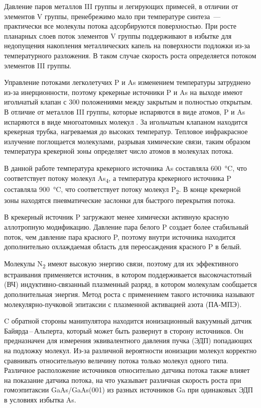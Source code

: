 Давление паров металлов III группы и легирующих примесей, в отличии от
элементов V группы, пренебрежимо мало при температуре синтеза~--- практически
все молекулы потока адсорбируются поверхностью. При росте планарных слоев поток
элементов V группы поддерживают в избытке для недопущения накопления
металлических капель на поверхности подложки из-за температурного разложения. В
таком случае скорость роста определяется потоком элементов III группы.

Управление потоками легколетучих P и As изменением температуры затруднено из-за
инерционности, поэтому крекерные источники P и As на выходе имеют игольчатый
клапан с 300 положениями между закрытым и полностью открытым. В отличие от
металлов III группы, которые испаряются в виде атомов, P и As испаряются в виде
многоатомных молекул \cite{Neave1980}. За игольчатым клапаном находится
крекерная трубка, нагреваемая до высоких температур. Тепловое инфракрасное
излучение поглощается молекулами, разрывая химические связи, таким образом
температура крекерной зоны определяет число атомов в молекулах потока.

В данной работе температура крекерного источника As составляла
600~\si{\degreeCelsius}, что соответствует потоку молекул As\textsubscript{4},
а температура крекерного источника P составляла 900~\si{\degreeCelsius}, что
соответствует потоку молекул P\textsubscript{2}. В конце крекерной зоны
находятся пневматические заслонки для быстрого перекрытия потока.

В крекерный источник P загружают менее химически активную красную аллотропную
модификацию. Давление пара белого P создает более стабильный поток, чем
давление пара красного P, поэтому внутри источника находится дополнительно
охлаждаемая область для переосаждения красного P в белый.

Молекулы N\textsubscript{2} имеют высокую энергию связи, поэтому для их
эффективного встраивания применяется источник, в котором поддерживается
высокочастотный (ВЧ) индуктивно-связанный плазменный разряд, в котором
молекулам сообщается дополнительная энергия. Метод роста с применением такого
источника называют молекулярно-пучковой эпитаксии с плазменной активацией азота
(ПА-МПЭ).

C обратной стороны манипулятора находится ионизационный вакуумный датчик
Байярда\,--\,Альперта, который может быть развернут в сторону источников. Он
предназначен для измерения эквивалентного давления пучка (ЭДП) попадающих на
подложку молекул. Из-за различной вероятности ионизации молекул корректно
сравнивать относительную величину потока только молекул одного типа. Различное
расположение источников относительно датчика потока также влияет на показание
датчика потока, на что указывает различная скорость роста при гомоэпитаксии
GaAs/GaAs(001) из разных источников Ga при одинаковых ЭДП в условиях избытка
As.

